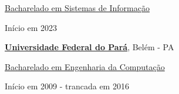 \documentclass[10pt]{article}
\newenvironment{outerlist}[1][\enskip\textbullet]%
{\begin{itemize}[#1]}{\end{itemize}%
    \vspace{-1em}}
\newenvironment{innerlist}[1][\enskip\textbullet]%
          {\begin{compactitem}[#1]}{\end{compactitem}}
\newcommand{\blankline}{\quad\pagebreak[2]}
\begin{document}
                \begin{outerlist}
                	\item[] \href{https://bsiangicos.ufersa.edu.br}{Bacharelado em Sistemas de Informação}
                	\begin{innerlist}
                		\item Início em 2023
                	\end{innerlist}
                \end{outerlist}
                
                \blankline
                
                
                \href{https://ufpa.br}{\textbf{Universidade Federal do Pará}}, Belém - PA

				\begin{outerlist}
					\item[] \href{https://www.fct.ufpa.br}{Bacharelado em Engenharia da Computação}
					\begin{innerlist}
						\item Início em 2009 - trancada em 2016
					\end{innerlist}
				\end{outerlist}
				
				\blankline
                
%                
                
				
\end{document}
